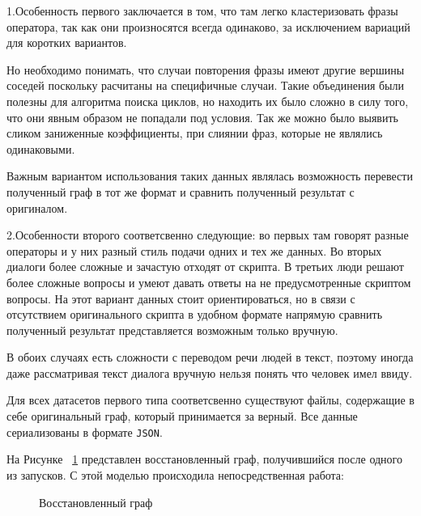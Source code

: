\documentclass[times,specification,annotation]{itmo-student-thesis}
\begin{document}
	1.Особенность первого заключается в том, что там легко кластеризовать фразы оператора, так как они произносятся всегда одинаково, за исключением вариаций для коротких вариантов. 
	
	Но необходимо понимать, что случаи повторения фразы имеют другие вершины соседей поскольку расчитаны на специфичные случаи. Такие объединения были полезны для алгоритма поиска циклов, но находить их было сложно в силу того, что они явным образом не попадали под условия. Так же можно было выявить сликом заниженные коэффициенты, при слиянии фраз, которые не являлись одинаковыми. 
	
	Важным вариантом использования таких данных являлась возможность  перевести полученный граф в тот же формат и сравнить полученный результат с оригиналом.
	
	2.Особенности второго соответсвенно следующие: во первых там говорят разные операторы и у них разный стиль подачи одних и тех же данных. Во вторых диалоги более сложные и зачастую отходят от скрипта. В третьих люди решают более сложные вопросы и умеют давать ответы на не предусмотренные скриптом вопросы. На этот вариант данных стоит ориентироваться, но в связи с отсутствием оригинального скрипта в удобном формате напрямую сравнить полученный результат представляется возможным только вручную.
	
	В обоих случаях есть сложности с переводом речи людей в текст, поэтому иногда даже рассматривая текст диалога вручную нельзя понять что человек имел ввиду.
	
	Для всех датасетов первого типа соответсвенно существуют файлы, содержащие в себе оригинальный граф, который принимается за верный. Все данные сериализованы в формате \texttt{JSON}. 
	
	На Рисунке ~\ref{fig:graph:restore} представлен восстановленный граф, получившийся после одного из запусков. С этой моделью происходила непосредственная работа:
	
	\begin{figure}[H]
		\caption{Восстановленный граф}
		\label{fig:graph:restore}
	\end{figure}
\end{document}
